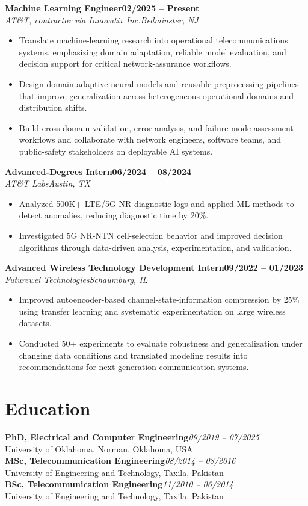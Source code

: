 \documentclass[9pt,letterpaper]{extarticle}
\newcommand{\role}[4]{\Needspace{4\baselineskip}\textbf{#1}\hfill\textbf{#2}\\[-1pt]\textit{#3}\hfill\textit{#4}\par}
\begin{document}
\role{Machine Learning Engineer}{02/2025 -- Present}{AT\&T, contractor via Innovatix Inc.}{Bedminster, NJ}
\begin{itemize}
\item Translate machine-learning research into operational telecommunications systems, emphasizing domain adaptation, reliable model evaluation, and decision support for critical network-assurance workflows.
\item Design domain-adaptive neural models and reusable preprocessing pipelines that improve generalization across heterogeneous operational domains and distribution shifts.
\item Build cross-domain validation, error-analysis, and failure-mode assessment workflows and collaborate with network engineers, software teams, and public-safety stakeholders on deployable AI systems.
\end{itemize}

\role{Advanced-Degrees Intern}{06/2024 -- 08/2024}{AT\&T Labs}{Austin, TX}
\begin{itemize}
\item Analyzed 500K+ LTE/5G-NR diagnostic logs and applied ML methods to detect anomalies, reducing diagnostic time by 20\%.
\item Investigated 5G NR-NTN cell-selection behavior and improved decision algorithms through data-driven analysis, experimentation, and validation.
\end{itemize}

\role{Advanced Wireless Technology Development Intern}{09/2022 -- 01/2023}{Futurewei Technologies}{Schaumburg, IL}
\begin{itemize}
\item Improved autoencoder-based channel-state-information compression by 25\% using transfer learning and systematic experimentation on large wireless datasets.
\item Conducted 50+ experiments to evaluate robustness and generalization under changing data conditions and translated modeling results into recommendations for next-generation communication systems.
\end{itemize}

\section{Education}
\textbf{PhD, Electrical and Computer Engineering}\hfill\textit{09/2019 -- 07/2025}\\
University of Oklahoma, Norman, Oklahoma, USA\\
\textbf{MSc, Telecommunication Engineering}\hfill\textit{08/2014 -- 08/2016}\\
University of Engineering and Technology, Taxila, Pakistan\\
\textbf{BSc, Telecommunication Engineering}\hfill\textit{11/2010 -- 06/2014}\\
University of Engineering and Technology, Taxila, Pakistan
\end{document}
